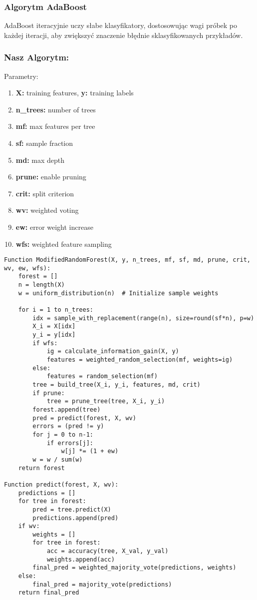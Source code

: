 \documentclass[12pt,a4paper]{article}
\begin{document}
\subsubsection{Algorytm AdaBoost}
AdaBoost iteracyjnie uczy słabe klasyfikatory, dostosowując wagi próbek po każdej iteracji, aby zwiększyć znaczenie błędnie sklasyfikowanych przykładów.


\subsubsection{Nasz Algorytm:}
Parametry:
\begin{enumerate}
    \item \textbf{X:} training features, \textbf{y:} training labels
    \item \textbf{n\_trees:} number of trees
    \item \textbf{mf:} max features per tree
    \item \textbf{sf:} sample fraction
    \item \textbf{md:} max depth
    \item \textbf{prune:} enable pruning
    \item \textbf{crit:} split criterion
    \item \textbf{wv:} weighted voting
    \item \textbf{ew:} error weight increase
    \item \textbf{wfs:} weighted feature sampling
\end{enumerate}
\clearpage
\begin{lstlisting}[caption=Pseudokod zmodyfikowanego algorytmu Random Forest]
Function ModifiedRandomForest(X, y, n_trees, mf, sf, md, prune, crit, wv, ew, wfs):
    forest = []
    n = length(X)
    w = uniform_distribution(n)  # Initialize sample weights

    for i = 1 to n_trees:
        idx = sample_with_replacement(range(n), size=round(sf*n), p=w)
        X_i = X[idx]
        y_i = y[idx]
        if wfs:
            ig = calculate_information_gain(X, y)
            features = weighted_random_selection(mf, weights=ig)
        else:
            features = random_selection(mf)
        tree = build_tree(X_i, y_i, features, md, crit)
        if prune:
            tree = prune_tree(tree, X_i, y_i)
        forest.append(tree)
        pred = predict(forest, X, wv)
        errors = (pred != y)
        for j = 0 to n-1:
            if errors[j]:
                w[j] *= (1 + ew)
        w = w / sum(w)
    return forest

Function predict(forest, X, wv):
    predictions = []
    for tree in forest:
        pred = tree.predict(X)
        predictions.append(pred)
    if wv:
        weights = []
        for tree in forest:
            acc = accuracy(tree, X_val, y_val)
            weights.append(acc)
        final_pred = weighted_majority_vote(predictions, weights)
    else:
        final_pred = majority_vote(predictions)
    return final_pred
\end{lstlisting}
\end{document}
